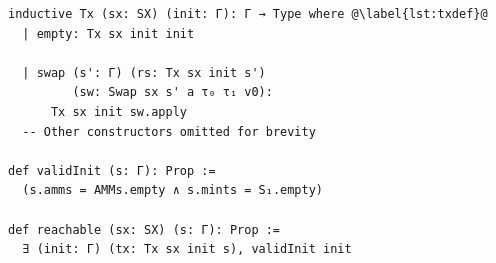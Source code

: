 \begin{table}[t]
    \caption{Sequences of transactions and reachable states.}
    \label{tab:reachable}
    \begin{lstlisting}
inductive Tx (sx: SX) (init: Γ): Γ → Type where @\label{lst:txdef}@
  | empty: Tx sx init init

  | swap (s': Γ) (rs: Tx sx init s')
         (sw: Swap sx s' a τ₀ τ₁ v0):
      Tx sx init sw.apply
  -- Other constructors omitted for brevity
  
def validInit (s: Γ): Prop :=
  (s.amms = AMMs.empty ∧ s.mints = S₁.empty)

def reachable (sx: SX) (s: Γ): Prop :=
  ∃ (init: Γ) (tx: Tx sx init s), validInit init
\end{lstlisting}
\end{table}